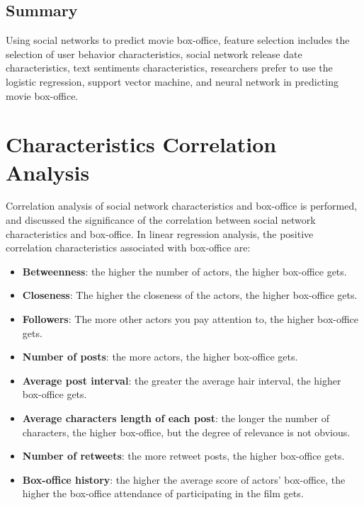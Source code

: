 \documentclass[review]{cvpr}
\begin{document}
\subsection{Summary}

  Using social networks to predict movie box-office, feature selection includes the selection of user behavior characteristics,
  social network release date characteristics, text sentiments characteristics,
  researchers prefer to use the logistic regression, support vector machine, and neural network in predicting movie box-office.


\section{Characteristics Correlation Analysis}

  Correlation analysis of social network characteristics and box-office is performed,
  and discussed the significance of the correlation between social network characteristics and box-office.
  In linear regression analysis, the positive correlation characteristics associated with box-office are:

\begin{itemize}
\item {\bf Betweenness}: the higher the number of actors, the higher box-office gets.
\item {\bf Closeness}: The higher the closeness of the actors, the higher box-office gets.
\item {\bf Followers}: The more other actors you pay attention to, the higher box-office gets.
\item {\bf Number of posts}: the more actors, the higher box-office gets.
\item {\bf Average post interval}: the greater the average hair interval, the higher box-office gets.
\item {\bf Average characters length of each post}: the longer the number of characters, the higher box-office, but the degree of relevance is not obvious.
\item {\bf Number of retweets}: the more retweet posts, the higher box-office gets.
\item {\bf Box-office history}: the higher the average score of actors' box-office, the higher the box-office attendance of participating in the film gets.
\end{itemize}
\end{document}
